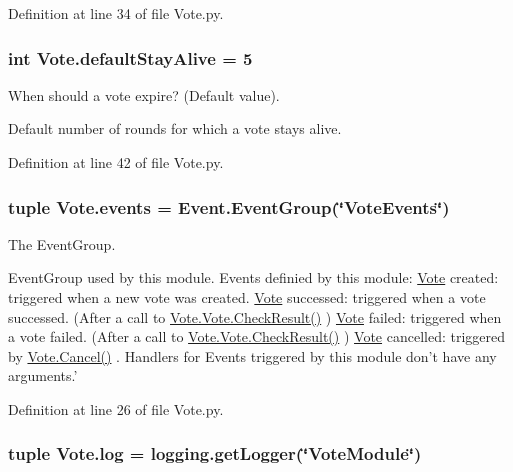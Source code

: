 Definition at line 34 of file Vote.py.

\hypertarget{namespace_vote_a3ed2d759405d2be1e6f53c128aef371a}{
\subsubsection[{defaultStayAlive}]{\setlength{\rightskip}{0pt plus 5cm}int {\bf Vote.defaultStayAlive} = 5}}
\label{namespace_vote_a3ed2d759405d2be1e6f53c128aef371a}


When should a vote expire? (Default value). 

Default number of rounds for which a vote stays alive. 

Definition at line 42 of file Vote.py.

\hypertarget{namespace_vote_a611c4a69371fcbdcc7683a654b737a14}{
\subsubsection[{events}]{\setlength{\rightskip}{0pt plus 5cm}tuple {\bf Vote.events} = {\bf Event.EventGroup}(\char`\"{}VoteEvents\char`\"{})}}
\label{namespace_vote_a611c4a69371fcbdcc7683a654b737a14}


The EventGroup. 

EventGroup used by this module. Events definied by this module: \hyperlink{namespace_vote}{Vote} created: triggered when a new vote was created. \hyperlink{namespace_vote}{Vote} successed: triggered when a vote successed. (After a call to \hyperlink{class_vote_1_1_vote_acda3525e83e91d9e4622218635f92d4b}{Vote.Vote.CheckResult()} ) \hyperlink{namespace_vote}{Vote} failed: triggered when a vote failed. (After a call to \hyperlink{class_vote_1_1_vote_acda3525e83e91d9e4622218635f92d4b}{Vote.Vote.CheckResult()} ) \hyperlink{namespace_vote}{Vote} cancelled: triggered by \hyperlink{namespace_vote_a5d75127361161b29f9a36a7f8d3cc1ed}{Vote.Cancel()} . Handlers for Events triggered by this module don't have any arguments.' 

Definition at line 26 of file Vote.py.

\hypertarget{namespace_vote_a081b01b11b311cef57a1bd37c864d363}{
\subsubsection[{log}]{\setlength{\rightskip}{0pt plus 5cm}tuple {\bf Vote.log} = logging.getLogger(\char`\"{}VoteModule\char`\"{})}}
\label{namespace_vote_a081b01b11b311cef57a1bd37c864d363}


